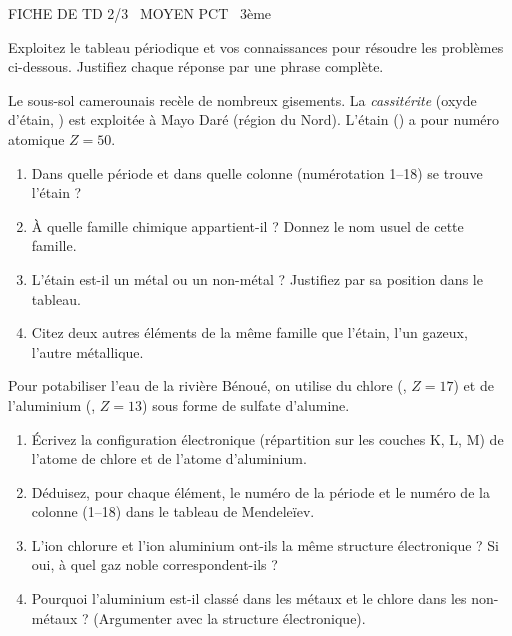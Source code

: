 \documentclass[11pt]{article}
\begin{document}
\begin{tcolorbox}[enhanced,colback=popink,colframe=popink,arc=10pt,boxrule=0pt,left=12pt,right=12pt,top=9pt,bottom=9pt]
{\color{white}\popxbold\small FICHE DE TD 2/3 \textbullet\ MOYEN \hfill PCT \textbullet\ 3ème\par}
\end{tcolorbox}
\vspace{4pt}
\noindent Exploitez le tableau périodique et vos connaissances pour résoudre les problèmes ci-dessous. Justifiez chaque réponse par une phrase complète.

\begin{exercice}
Le sous-sol camerounais recèle de nombreux gisements. La \textit{cassitérite} (oxyde d'étain, ) est exploitée à Mayo Daré (région du Nord). L'étain () a pour numéro atomique $Z = 50$.
\begin{enumerate}
    \item Dans quelle période et dans quelle colonne (numérotation 1--18) se trouve l'étain ? 
    \item À quelle famille chimique appartient-il ? Donnez le nom usuel de cette famille.
    \item L'étain est-il un métal ou un non-métal ? Justifiez par sa position dans le tableau.
    \item Citez deux autres éléments de la même famille que l'étain, l'un gazeux, l'autre métallique.
\end{enumerate}
\end{exercice}

\begin{exercice}
Pour potabiliser l'eau de la rivière Bénoué, on utilise du chlore (, $Z=17$) et de l'aluminium (, $Z=13$) sous forme de sulfate d'alumine.
\begin{enumerate}
    \item Écrivez la configuration électronique (répartition sur les couches K, L, M) de l'atome de chlore et de l'atome d'aluminium.
    \item Déduisez, pour chaque élément, le numéro de la période et le numéro de la colonne (1--18) dans le tableau de Mendeleïev.
    \item L'ion chlorure  et l'ion aluminium  ont-ils la même structure électronique ? Si oui, à quel gaz noble correspondent-ils ?
    \item Pourquoi l'aluminium est-il classé dans les métaux et le chlore dans les non-métaux ? (Argumenter avec la structure électronique).
\end{enumerate}
\end{exercice}
\end{document}

